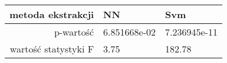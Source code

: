 \begin{tabular}{|r|l|l|}
  \hline
  metoda ekstrakcji & NN & Svm \\
  \hline
  p-wartość & 6.851668e-02 & 7.236945e-11 \\
  \hline
  wartość statystyki F & 3.75 & 182.78 \\
  \hline
\end{tabular}
